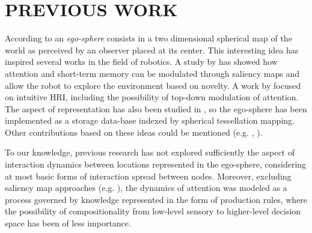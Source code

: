 \documentclass[letterpaper, 10 pt, conference]{ieeeconf}  %
\begin{document}
	
	
	\section{PREVIOUS WORK}
	\label{sec:previous}
	

	According to \cite{albus1991} an \textit{ego-sphere} consists in a two dimensional spherical map of the world as perceived by an observer placed at its center. This interesting idea has inspired several works in the field of robotics. A study by \cite{ruesch2008} has showed how attention and short-term memory can be modulated through saliency maps and allow the robot to explore the environment based on novelty. A work by \cite{bodiroza2011} focused on intuitive HRI, including the possibility of top-down modulation of attention. The aspect of representation has also been studied in \cite{peters2009sensory}, so the ego-sphere has been implemented as a storage data-base indexed by spherical tessellation mapping. Other contributions based on these ideas could be mentioned (e.g. \cite{grotz2017}, \cite{marques2022}).
	
	
	To our knowledge, previous research has not explored sufficiently the aspect of interaction dynamics between locations represented in the ego-sphere, considering at most basic forms of interaction spread between nodes. Moreover, excluding saliency map approaches (e.g. \cite{ruesch2008}), the dynamics of attention was modeled as a process governed by knowledge represented in the form of production rules, where the possibility of compositionality from low-level sensory to higher-level decision space has been of less importance. 
	 
	
	
\end{document}

